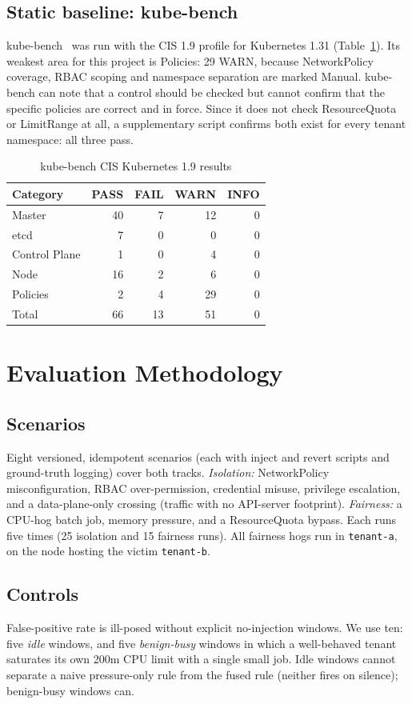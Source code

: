 \documentclass[conference]{IEEEtran}
\newcommand{\code}[1]{\texttt{\small #1}}
\begin{document}
\subsection{Static baseline: kube-bench}
kube-bench~\cite{kubebench} was run with the CIS 1.9 profile for Kubernetes 1.31 (Table~\ref{tab:kb}). Its weakest area for this project is Policies: 29 WARN, because NetworkPolicy coverage, RBAC scoping and namespace separation are marked Manual. kube-bench can note that a control should be checked but cannot confirm that the specific policies are correct and in force. Since it does not check ResourceQuota or LimitRange at all, a supplementary script confirms both exist for every tenant namespace: all three pass.

\begin{table}[t]
\caption{kube-bench CIS Kubernetes 1.9 results}
\label{tab:kb}
\centering
\begin{tabular}{lrrrr}
\toprule
Category & PASS & FAIL & WARN & INFO\\
\midrule
Master & 40 & 7 & 12 & 0\\
etcd & 7 & 0 & 0 & 0\\
Control Plane & 1 & 0 & 4 & 0\\
Node & 16 & 2 & 6 & 0\\
Policies & 2 & 4 & 29 & 0\\
\midrule
Total & 66 & 13 & 51 & 0\\
\bottomrule
\end{tabular}
\end{table}

\section{Evaluation Methodology}
\subsection{Scenarios}
Eight versioned, idempotent scenarios (each with inject and revert scripts and ground-truth logging) cover both tracks. \emph{Isolation:} NetworkPolicy misconfiguration, RBAC over-permission, credential misuse, privilege escalation, and a data-plane-only crossing (traffic with no API-server footprint). \emph{Fairness:} a CPU-hog batch job, memory pressure, and a ResourceQuota bypass. Each runs five times (25 isolation and 15 fairness runs). All fairness hogs run in \code{tenant-a}, on the node hosting the victim \code{tenant-b}.

\subsection{Controls}
False-positive rate is ill-posed without explicit no-injection windows. We use ten: five \emph{idle} windows, and five \emph{benign-busy} windows in which a well-behaved tenant saturates its own 200m CPU limit with a single small job. Idle windows cannot separate a naive pressure-only rule from the fused rule (neither fires on silence); benign-busy windows can.
\end{document}
